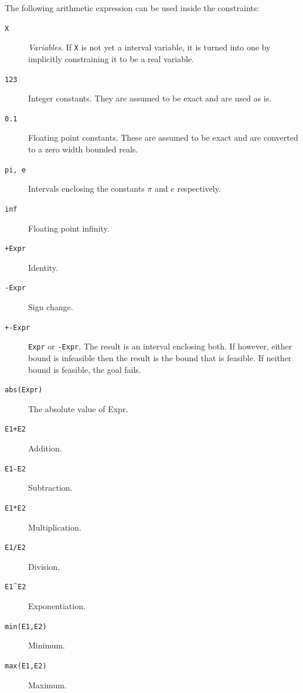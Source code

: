 The following arithmetic expression can be used inside the constraints:
\begin{description}
\item[{\texttt X}]
    \emph{Variables}. If \verb|X| is not yet a interval variable,
    it is turned into one by implicitly constraining it to be a real
    variable.

\item[\texttt{123}]
    Integer constants.  They are assumed to be exact and are used
    as is.

\item[\texttt{0.1}]
    Floating point constants.  These are assumed to be exact and
    are converted to a zero width bounded reals.

\item[\texttt{pi,  e}]
    Intervals enclosing the constants $\pi$ and $e$ respectively.

\item[\texttt{inf}]
    Floating point infinity.

\item[\texttt{+Expr}]
    Identity.

\item[\texttt{-Expr}]
    Sign change.

\item[\texttt{+-Expr}]
    \verb|Expr| or \verb|-Expr|. The result is an interval
    enclosing both. If however, either bound is infeasible then
    the result is the bound that is feasible. If neither bound is
    feasible, the goal fails.

\item[\texttt{abs(Expr)}]
    The absolute value of Expr.

\item[\texttt{E1+E2}]
    Addition.

\item[\texttt{E1-E2}]
    Subtraction.

\item[\texttt{E1*E2}]
    Multiplication.

\item[\texttt{E1/E2}]
    Division.

\item[\texttt{E1}\textasciicircum{}\texttt{E2}]
    Exponentiation.

\item[\texttt{min(E1,E2)}]
    Minimum.

\item[\texttt{max(E1,E2)}]
    Maximum.


\end{description}
